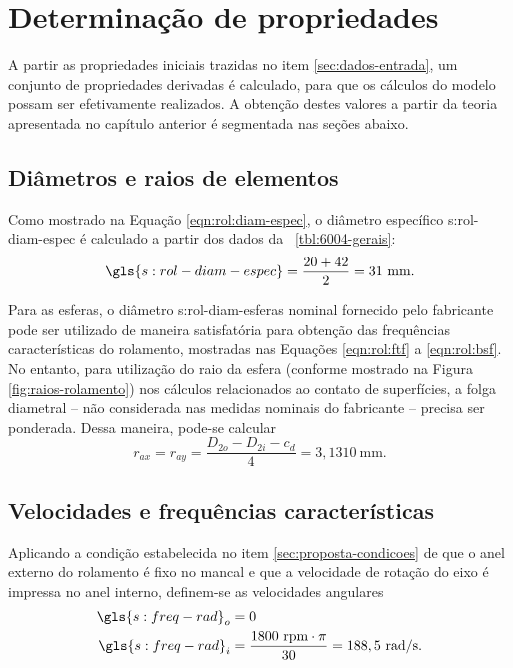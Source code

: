 \documentclass[12pt,oneside,english,brazil,lmodern,siglas,simbolos,cite=num]{ucsmonograph}
\begin{document}
	\section{Determinação de propriedades}
	A partir as propriedades iniciais trazidas no item \ref{sec:dados-entrada}, um conjunto de propriedades derivadas é calculado, para que os cálculos do modelo possam ser efetivamente realizados.
	A obtenção destes valores a partir da teoria apresentada no capítulo anterior é segmentada nas seções abaixo.

	\subsection{Diâmetros e raios de elementos}	
	Como mostrado na Equação \ref{eqn:rol:diam-espec}, o diâmetro específico \gls{s:rol-diam-espec} é calculado a partir dos dados da \tablename\ \ref{tbl:6004-gerais}:
	\begin{equation*}
		\gls{s:rol-diam-espec} = \frac{20 + 42}{2} = 31\ \text{mm}.
	\end{equation*}
	
	Para as esferas, o diâmetro \gls{s:rol-diam-esferas} nominal fornecido pelo fabricante pode ser utilizado de maneira satisfatória para obtenção das frequências características do rolamento, mostradas nas Equações \ref{eqn:rol:ftf} a \ref{eqn:rol:bsf}.
	No entanto, para utilização do raio da esfera (conforme mostrado na Figura \ref{fig:raios-rolamento}) nos cálculos relacionados ao contato de superfícies, a folga diametral -- não considerada nas medidas nominais do fabricante -- precisa ser ponderada.
	Dessa maneira, pode-se calcular
	\begin{equation}
		r_{ax} = r_{ay} = \frac{D_{2o} - D_{2i} - c_d}{4} = 3,1310\ \text{mm}.
	\end{equation}
	
	\subsection{Velocidades e frequências características}
	Aplicando a condição estabelecida no item \ref{sec:proposta-condicoes} de que o anel externo do rolamento é fixo no mancal e que a velocidade de rotação do eixo é impressa no anel interno, definem-se as velocidades angulares
	\setlength{}
	\begin{align}
		\gls{s:freq-rad}_o &= 0 \\
		\gls{s:freq-rad}_i &= \frac{1800\ \text{rpm}\cdot\pi}{30} = 188,5\ \text{rad/s}.
	\end{align}
	
\end{document}
